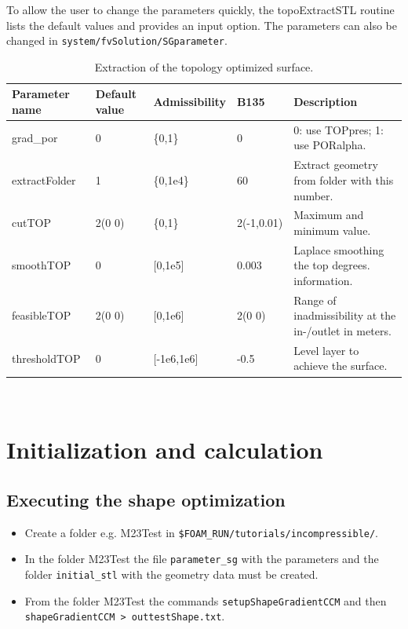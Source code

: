 \documentclass[oneside]{article}
\numberwithin{equation}{section}
\numberwithin{figure}{section}
\numberwithin{figure}{section}
\begin{document}
To allow the user to change the parameters quickly, the topoExtractSTL routine lists the default values and provides an input option. The parameters can also be changed in \texttt{system/fvSolution/SGparameter}.
\begin{table}[h]
    \centering
    \begin{tabular}{|p{2cm}|p{1cm}|p{1.6cm}|p{1.5cm}|p{4.4cm}|} %
        \hline
        \cellcolor{light-gray} Parameter name & \cellcolor{light-gray} Default value & \cellcolor{light-gray} Admissibility & \cellcolor{light-gray} B135 & \cellcolor{light-gray} Description\\
        \hline
        grad\_por          & 0      &  \{0,1\}                & 0          & 0: use TOPpres; 1: use PORalpha.\\
        \hline
        extractFolder      & 1      &  \{0,1e4\}              & 60         &  Extract geometry from folder with this number.\\
        \hline
        cutTOP             & 2(0 0) &  \{0,1\}                & 2(-1,0.01) & Maximum and minimum value.\\
        \hline
        smoothTOP          &   0    &  [0,1e5]                & 0.003      & Laplace smoothing the top degrees. information.\\
        \hline
        feasibleTOP        & 2(0 0) &  [0,1e6]                & 2(0 0)     & Range of inadmissibility at the in-/outlet in meters.\\
        \hline
        thresholdTOP       &   0    &  [-1e6,1e6]             & -0.5       & Level layer to achieve the surface.\\
        \hline
    \end{tabular}
    \caption{Extraction of the topology optimized surface.}\label{tab:parameter10b}
\end{table}
$ $
\newpage
\section{Initialization and calculation}

\subsection{Executing the shape optimization}
\begin{itemize}
    \item Create a folder e.g. M23Test in \verb|$FOAM_RUN/tutorials/incompressible/|.
    \item In the folder M23Test the file \verb|parameter_sg| with the parameters and the folder \verb|initial_stl| with the geometry data must be created.
    \item From the folder M23Test the commands \texttt{setupShapeGradientCCM} and then
    \texttt{shapeGradientCCM > outtestShape.txt}.
\end{itemize}
\end{document}

